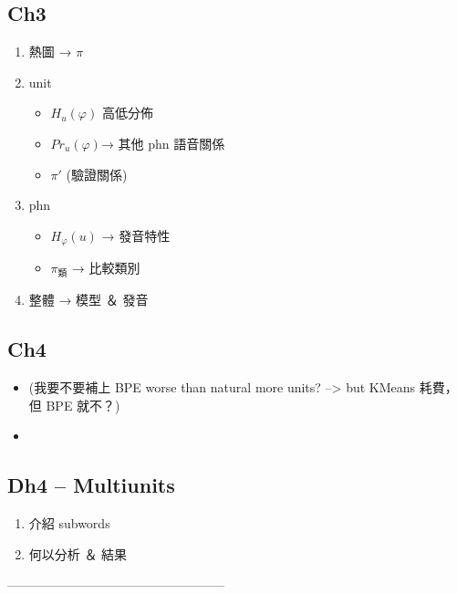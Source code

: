 \subsection{Ch3}
\begin{enumerate}
    \item 熱圖 → $\pi$
    \item unit
      \begin{itemize}
        \item $H_u(\varphi)$ 高低分佈
        \item $Pr_u(\varphi)$→ 其他 phn 語音關係
        \item $\pi'$ (驗證關係)
      \end{itemize}
    \item phn
      \begin{itemize}
        \item $H_{\varphi}(u)$ → 發音特性
        \item $\pi_{類}$ → 比較類別
      \end{itemize}
    \item 整體 → 模型 ＆ 發音
\end{enumerate}
{
\subsection{Ch4}
\begin{itemize}
    \item (我要不要補上 BPE worse than natural more units? --> but KMeans 耗費，但 BPE 就不？)
    \item %
\end{itemize}

\subsection{Dh4 -- Multiunits}  %
\begin{enumerate}
    \item 介紹 subwords
    \item 何以分析 ＆ 結果
\end{enumerate}

---------------------------------------------------
{
\cite{-}  %
}
}
